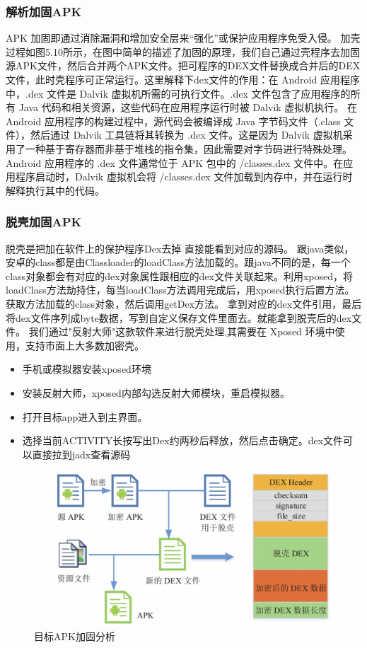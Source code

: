 \subsubsection{解析加固APK}
APK 加固即通过消除漏洞和增加安全层来“强化”或保护应用程序免受入侵。
加壳过程如图5.10所示，在图中简单的描述了加固的原理，我们自己通过壳程序去加固源APK文件，然后合并两个APK文件。把可程序的DEX文件替换成合并后的DEX文件，此时壳程序可正常运行。这里解释下dex文件的作用：在 Android 应用程序中，.dex 文件是 Dalvik 虚拟机所需的可执行文件。.dex 文件包含了应用程序的所有 Java 代码和相关资源，这些代码在应用程序运行时被 Dalvik 虚拟机执行。
在 Android 应用程序的构建过程中，源代码会被编译成 Java 字节码文件（.class 文件），然后通过 Dalvik 工具链将其转换为 .dex 文件。这是因为 Dalvik 虚拟机采用了一种基于寄存器而非基于堆栈的指令集，因此需要对字节码进行特殊处理。
Android 应用程序的 .dex 文件通常位于 APK 包中的 /classes.dex 文件中。在应用程序启动时，Dalvik 虚拟机会将 /classes.dex 文件加载到内存中，并在运行时解释执行其中的代码。
\subsubsection{脱壳加固APK}
脱壳是把加在软件上的保护程序Dex去掉 直接能看到对应的源码。
跟java类似，安卓的class都是由Classloader的loadClass方法加载的。跟java不同的是，每一个class对象都会有对应的dex对象属性跟相应的dex文件关联起来。利用xposed，将loadClass方法劫持住，每当loadClass方法调用完成后，用xposed执行后置方法。获取方法加载的class对象，然后调用getDex方法。
拿到对应的dex文件引用，最后将dex文件序列成byte数据，写到自定义保存文件里面去。就能拿到脱壳后的dex文件。
我们通过"反射大师"这款软件来进行脱壳处理,其需要在 Xposed 环境中使用，支持市面上大多数加密壳。
\begin{itemize}
  \item 手机或模拟器安装xposed环境
  \item 安装反射大师，xposed内部勾选反射大师模块，重启模拟器。
  \item 打开目标app进入到主界面。
  \item 选择当前ACTIVITY长按写出Dex约两秒后释放，然后点击确定。dex文件可以直接拉到jadx查看源码
\end{itemize}

\begin{figure}
  \centering
  \includegraphics[scale=0.5]{resources/img/i24.png}
  \caption{目标APK加固分析}
\end{figure}

